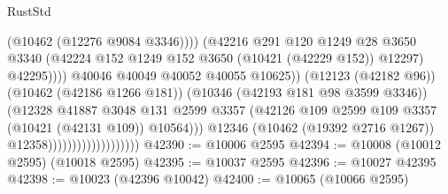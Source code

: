 \begin{lexlean}{RustStd}
\begin{coremodule}
                                                          (@10462 (@12276 @9084 @3346))))
                                                      (@42216
                                                        @291
                                                        @120
                                                        @1249
                                                        @28
                                                        @3650
                                                        @3340
                                                        (@42224
                                                          @152
                                                          @1249
                                                          @152
                                                          @3650
                                                          (@10421 (@42229 @152))
                                                          @12297)
                                                        @42295))))
                                                @40046
                                                @40049
                                                @40052
                                                @40055
                                                @10625))
                                            (@12123 (@42182 @96))
                                            (@10462 (@42186 @1266 @181))
                                            (@10346 (@42193 @181 @98 @3599 @3346))
                                            (@12328
                                              @41887
                                              @3048
                                              @131
                                              @2599
                                              @3357
                                              (@42126
                                                @109
                                                @2599
                                                @109
                                                @3357
                                                (@10421 (@42131 @109))
                                                @10564)))
                                          @12346
                                          (@10462 (@19392 @2716 @1267))
                                          @12358)))))))))))))))))))
@42390 := @10006 @2595
@42394 := @10008 (@10012 @2595) (@10018 @2595)
@42395 := @10037 @2595
@42396 := @10027 @42395
@42398 := @10023 (@42396 @10042)
@42400 := @10065 (@10066 @2595)

\end{coremodule}
\end{lexlean}
